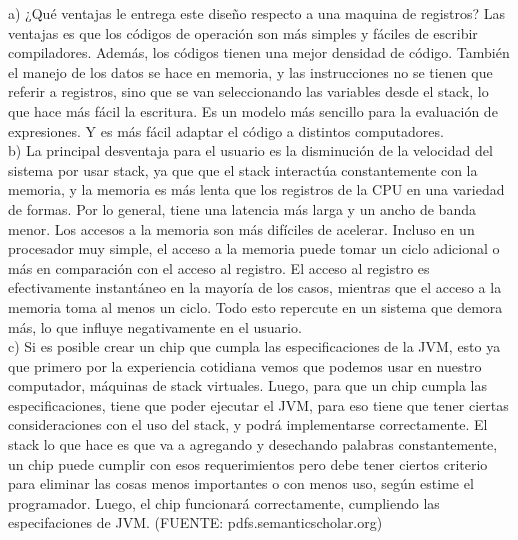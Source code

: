 \documentclass[letter]{article}
\begin{document}
	\begin{pregunta}{4}
	$$ $$
	a) ¿Qué ventajas le entrega este diseño respecto a una maquina de registros?
	Las ventajas es que los códigos de operación son más simples y  fáciles de escribir compiladores. Además, los códigos tienen una mejor densidad de código. También el manejo de los datos se hace en memoria, y las instrucciones no se tienen que referir a registros, sino que se van seleccionando las variables desde el stack, lo que hace más fácil la escritura. Es un modelo más sencillo para la evaluación de expresiones. Y es más fácil adaptar el código a distintos computadores.
	$$ $$
	b) La principal desventaja para el usuario es la disminución de la velocidad del sistema por usar stack, ya que que el stack interactúa constantemente con la memoria, y la memoria es más lenta que los registros de la CPU en una variedad de formas. Por lo general, tiene una latencia más larga y un ancho de banda menor. Los accesos a la memoria son más difíciles de acelerar. Incluso en un procesador muy simple, el acceso a la memoria puede tomar un ciclo adicional o más en comparación con el acceso al registro. El acceso al registro es efectivamente instantáneo en la mayoría de los casos, mientras que el acceso a la memoria toma al menos un ciclo. Todo esto repercute en un sistema que demora más, lo que influye negativamente en el usuario.
	$$ $$
	c)  Si es posible crear un chip que cumpla las  especificaciones de la JVM, esto ya que primero por la experiencia cotidiana vemos que podemos usar en nuestro computador, máquinas de stack virtuales. Luego, para que un chip cumpla las especificaciones, tiene que poder ejecutar el JVM, para eso tiene que tener ciertas consideraciones con el uso del stack, y podrá implementarse correctamente. El stack lo que hace es que va a agregando y desechando palabras constantemente, un chip puede cumplir con esos requerimientos pero debe tener ciertos criterio para eliminar las cosas menos importantes o con menos uso, según estime el programador. Luego, el chip funcionará correctamente, cumpliendo las especifaciones de JVM. (FUENTE: pdfs.semanticscholar.org)
	
	
		
	\end{pregunta}
\end{document}

